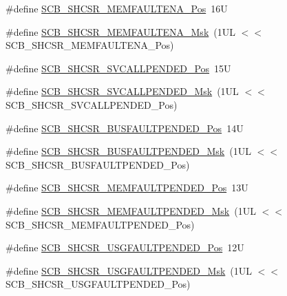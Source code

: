 \begin{DoxyCompactItemize}
\item 
\#define \hyperlink{group___c_m_s_i_s___s_c_b_ga685b4564a8760b4506f14ec4307b7251}{S\-C\-B\-\_\-\-S\-H\-C\-S\-R\-\_\-\-M\-E\-M\-F\-A\-U\-L\-T\-E\-N\-A\-\_\-\-Pos}~16\-U
\item 
\#define \hyperlink{group___c_m_s_i_s___s_c_b_gaf084424fa1f69bea36a1c44899d83d17}{S\-C\-B\-\_\-\-S\-H\-C\-S\-R\-\_\-\-M\-E\-M\-F\-A\-U\-L\-T\-E\-N\-A\-\_\-\-Msk}~(1\-U\-L $<$$<$ S\-C\-B\-\_\-\-S\-H\-C\-S\-R\-\_\-\-M\-E\-M\-F\-A\-U\-L\-T\-E\-N\-A\-\_\-\-Pos)
\item 
\#define \hyperlink{group___c_m_s_i_s___s_c_b_ga2f93ec9b243f94cdd3e94b8f0bf43641}{S\-C\-B\-\_\-\-S\-H\-C\-S\-R\-\_\-\-S\-V\-C\-A\-L\-L\-P\-E\-N\-D\-E\-D\-\_\-\-Pos}~15\-U
\item 
\#define \hyperlink{group___c_m_s_i_s___s_c_b_ga6095a7acfbad66f52822b1392be88652}{S\-C\-B\-\_\-\-S\-H\-C\-S\-R\-\_\-\-S\-V\-C\-A\-L\-L\-P\-E\-N\-D\-E\-D\-\_\-\-Msk}~(1\-U\-L $<$$<$ S\-C\-B\-\_\-\-S\-H\-C\-S\-R\-\_\-\-S\-V\-C\-A\-L\-L\-P\-E\-N\-D\-E\-D\-\_\-\-Pos)
\item 
\#define \hyperlink{group___c_m_s_i_s___s_c_b_gaa22551e24a72b65f1e817f7ab462203b}{S\-C\-B\-\_\-\-S\-H\-C\-S\-R\-\_\-\-B\-U\-S\-F\-A\-U\-L\-T\-P\-E\-N\-D\-E\-D\-\_\-\-Pos}~14\-U
\item 
\#define \hyperlink{group___c_m_s_i_s___s_c_b_ga677c23749c4d348f30fb471d1223e783}{S\-C\-B\-\_\-\-S\-H\-C\-S\-R\-\_\-\-B\-U\-S\-F\-A\-U\-L\-T\-P\-E\-N\-D\-E\-D\-\_\-\-Msk}~(1\-U\-L $<$$<$ S\-C\-B\-\_\-\-S\-H\-C\-S\-R\-\_\-\-B\-U\-S\-F\-A\-U\-L\-T\-P\-E\-N\-D\-E\-D\-\_\-\-Pos)
\item 
\#define \hyperlink{group___c_m_s_i_s___s_c_b_gaceb60fe2d8a8cb17fcd1c1f6b5aa924f}{S\-C\-B\-\_\-\-S\-H\-C\-S\-R\-\_\-\-M\-E\-M\-F\-A\-U\-L\-T\-P\-E\-N\-D\-E\-D\-\_\-\-Pos}~13\-U
\item 
\#define \hyperlink{group___c_m_s_i_s___s_c_b_ga9abc6c2e395f9e5af4ce05fc420fb04c}{S\-C\-B\-\_\-\-S\-H\-C\-S\-R\-\_\-\-M\-E\-M\-F\-A\-U\-L\-T\-P\-E\-N\-D\-E\-D\-\_\-\-Msk}~(1\-U\-L $<$$<$ S\-C\-B\-\_\-\-S\-H\-C\-S\-R\-\_\-\-M\-E\-M\-F\-A\-U\-L\-T\-P\-E\-N\-D\-E\-D\-\_\-\-Pos)
\item 
\#define \hyperlink{group___c_m_s_i_s___s_c_b_ga3cf03acf1fdc2edc3b047ddd47ebbf87}{S\-C\-B\-\_\-\-S\-H\-C\-S\-R\-\_\-\-U\-S\-G\-F\-A\-U\-L\-T\-P\-E\-N\-D\-E\-D\-\_\-\-Pos}~12\-U
\item 
\#define \hyperlink{group___c_m_s_i_s___s_c_b_ga122b4f732732010895e438803a29d3cc}{S\-C\-B\-\_\-\-S\-H\-C\-S\-R\-\_\-\-U\-S\-G\-F\-A\-U\-L\-T\-P\-E\-N\-D\-E\-D\-\_\-\-Msk}~(1\-U\-L $<$$<$ S\-C\-B\-\_\-\-S\-H\-C\-S\-R\-\_\-\-U\-S\-G\-F\-A\-U\-L\-T\-P\-E\-N\-D\-E\-D\-\_\-\-Pos)
$$
\end{DoxyCompactItemize}
